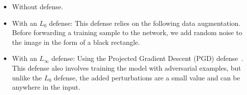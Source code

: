 \begin{itemize}
    \item Without defense. %
      \item With an $L_0$ defense: This defense relies on the following data augmentation.
    Before forwarding a training sample to the network, we add random noise to the image in the form of a black rectangle.
        \item With an $L_{\infty}$ defense: Using the Projected Gradient Descent (PGD) defense~\cite{PGD}.
    This defense also involves training the model with adversarial examples, but unlike the $L_0$ defense, the added perturbations are a small value and can be anywhere in the input.
\end{itemize} 

